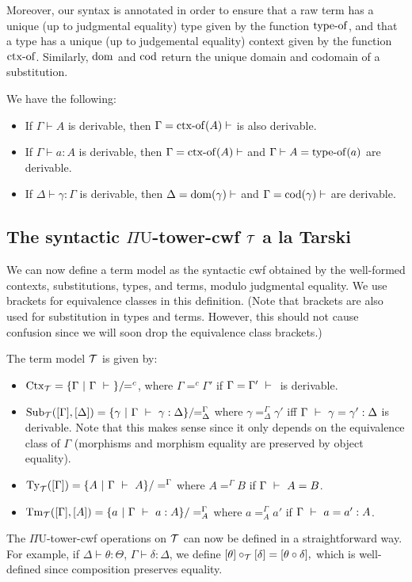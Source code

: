 \documentclass{lmcs}
\def\UU{\mathrm{U}}
\begin{document}
Moreover, our syntax is annotated in order to ensure that a raw term has a unique (up to judgmental
equality) type given by the function $\operatorname{type-of}$, and that a type has a unique (up to judgemental equality) context given by the function
$\operatorname{ctx-of}$. Similarly, $\operatorname{dom}$ and $\operatorname{cod}$ return the unique domain and codomain of a substitution.

\begin{lem}\label{lemma:unique_typing}
  We have the following:
  \begin{itemize}
  \item If $ \Gamma   \vdash  A$ is derivable, then $  \Gamma  = \operatorname{ctx-of} (A)\vdash  $ is also derivable.
  \item If $ \Gamma   \vdash  a : A$ is derivable, then $ \Gamma  = \operatorname{ctx-of} (A)\vdash   $ and $
\Gamma   \vdash A = \operatorname{type-of} (a)$ are derivable.
  \item If $ \Delta   \vdash   \gamma  :  \Gamma $ is derivable, then $  \Delta  = \operatorname{dom}(
\gamma )\vdash  $ and $ \Gamma  = \operatorname{cod}( \gamma )\vdash   $ are derivable.
  \end{itemize}
\end{lem}

\subsection{The syntactic $\Pi\UU$-tower-cwf ${\mathcal T}$ a la Tarski}
We can now define a term model as the syntactic cwf obtained by the well-formed contexts, substitutions, types, and terms, modulo judgmental equality. We use brackets for equivalence classes in this definition. (Note that brackets are also used for substitution in types and terms. However, this should not cause confusion since we will soon drop the equivalence class brackets.)

\begin{defi}
The term model ${\mathcal T}$ is given by:
\begin{itemize}
\item $\mathrm{Ctx}_{\mathcal T} = \{ {\Gamma}\ |\ \Gamma \ \vdash\  \} /\!\! =^c$, where
  ${\Gamma} =^c {\Gamma}'$ if ${\Gamma} = {\Gamma}' \ \vdash\ $ is
  derivable.
\item
  $\mathrm{Sub}_{\mathcal T}([{\Gamma}],[{\Delta}]) = \{ \gamma\ |\ \Gamma \ \vdash\  \gamma
  : {\Delta} \} /\!\! =^{\Gamma}_{\Delta}$
  where $\gamma =^{\Gamma}_{\Delta} \gamma'$ iff
  ${\Gamma} \ \vdash\  \gamma = \gamma' : {\Delta}$ is derivable. Note that
  this makes sense since it only depends on the equivalence class of
  $\Gamma$ (morphisms and morphism equality are preserved by object
  equality).
\item $\mathrm{Ty}_{\mathcal T}([{\Gamma}]) = \{ A\ |\ \Gamma \ \vdash\  A
  \}/=^{\Gamma}$ where $A =^{\Gamma} B$ if $\Gamma \ \vdash\  A =
  B$.
\item $\Tm_\T([{\Gamma}],[A]) = \{ a\ |\ \Gamma \vdashS a: A\} / =^{\Gamma}_A$ where $a =^{\Gamma}_A
a'$ if $\Gamma \ \vdash\  a = a' : A$. 
\end{itemize}
The $\Pi\UU$-tower-cwf operations on ${\mathcal T}$ can now be defined in a straightforward way. For example, if $\Delta \vdash \theta : \Theta$, $\Gamma \vdash \delta : \Delta$, we define
$
[\theta ] \circ_{\mathcal T} [\delta] = [\theta \circ \delta],
$
which is well-defined since composition preserves equality.
\end{defi}
\end{document}
